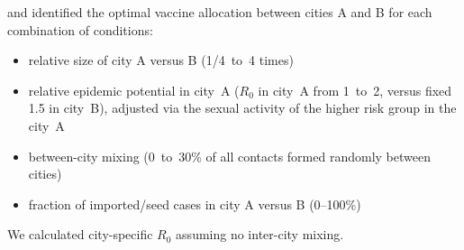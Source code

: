 and identified the optimal vaccine allocation between cities A and B
for each combination of conditions:
\begin{itemize}
  \item relative size of city A versus B (1/4~to~4 times)
  \item relative epidemic potential in city~A ($R_0$ in city~A from 1~to~2, versus fixed 1.5 in city~B),
        adjusted via the sexual activity of the higher risk group in the city~A
  \item between-city mixing (0~to~30\% of all contacts formed randomly between cities)
  \item fraction of imported/seed cases in city A versus B (0--100\%)
\end{itemize}
We calculated city-specific $R_0$ assuming no inter-city mixing.


